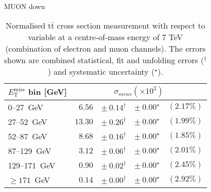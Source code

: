 \documentclass{article}
\newcommand{\ttbar}{\ensuremath{\text{t}\bar{\text{t}}}\xspace}
\newcommand{\GeV}{GeV}
\begin{document}
MUON down
\begin{table}[htbp]
\setlength{\tabcolsep}{2pt}
\centering
\caption{Normalised \ttbar cross section measurement with respect to \MET variable
at a centre-of-mass energy of 7 TeV (combination of electron and muon channels). The errors shown are combined statistical, fit and unfolding errors ($^\dagger$) and systematic uncertainty ($^\star$).}
\label{tab:MET_xsections_7TeV_Muon_down_combined}
\begin{tabular}{lrrrr}
\hline
$E_{\mathrm{T}}^{\mathrm{miss}}$ bin [\GeV] & \multicolumn{4}{c}{$\sigma_{meas} \left(\times 10^{3}\right)$}\\ 
\hline
0--27~\GeV &  $6.56$ & $ \pm~ 0.14^\dagger$ & $ \pm~ 0.00^\star$ & $(2.17\%)$\\ 
27--52~\GeV &  $13.30$ & $ \pm~ 0.26^\dagger$ & $ \pm~ 0.00^\star$ & $(1.99\%)$\\ 
52--87~\GeV &  $8.68$ & $ \pm~ 0.16^\dagger$ & $ \pm~ 0.00^\star$ & $(1.85\%)$\\ 
87--129~\GeV &  $3.12$ & $ \pm~ 0.06^\dagger$ & $ \pm~ 0.00^\star$ & $(2.01\%)$\\ 
129--171~\GeV &  $0.90$ & $ \pm~ 0.02^\dagger$ & $ \pm~ 0.00^\star$ & $(2.45\%)$\\ 
$\geq 171$~\GeV &  $0.14$ & $ \pm~ 0.00^\dagger$ & $ \pm~ 0.00^\star$ & $(2.92\%)$\\ 
\hline 
\end{tabular}
\end{table}
\end{document}
